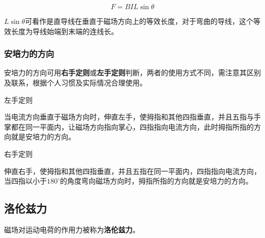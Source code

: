 \begin{equation}
F=BIL\sin\theta
\end{equation}

$ L\sin\theta$可看作是直导线在垂直于磁场方向上的等效长度，对于弯曲的导线，这个等效长度为导线始端到末端的连线长。

\subsubsection{安培力的方向}

安培力的方向可用\textbf{右手定则}或\textbf{左手定则}判断，两者的使用方式不同，需注意其区别及联系，根据个人习惯及实际情况合理使用。

左手定则

当电流方向垂直于磁场方向时，伸直左手，使拇指和其他四指垂直，并且五指与手掌都在同一平面内，让磁场方向指向掌心，四指指向电流方向，此时拇指所指的方向就是安培力的方向。

右手定则

伸直右手，使拇指和其他四指垂直，并且五指在同一平面内，四指指向电流方向，当四指以小于$180^\circ$的角度弯向磁场方向时，拇指所指的方向就是安培力的方向。


\subsection{洛伦兹力}

磁场对运动电荷的作用力被称为\textbf{洛伦兹力}。
